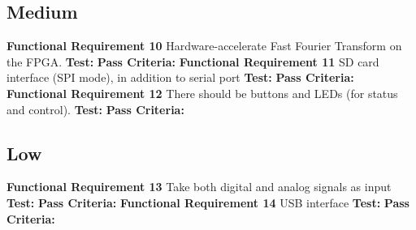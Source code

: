 \subsection{Medium}
\textbf{Functional Requirement 10}
Hardware-accelerate Fast Fourier Transform on the FPGA.
\textbf{Test:}
\textbf{Pass Criteria:}
\textbf{Functional Requirement 11}
SD card interface (SPI mode), in addition to serial port
\textbf{Test:}
\textbf{Pass Criteria:}
\textbf{Functional Requirement 12}
There should be buttons and LEDs (for status and control).
\textbf{Test:}
\textbf{Pass Criteria:}


\subsection{Low}
\textbf{Functional Requirement 13}
Take both digital and analog signals as input
\textbf{Test:}
\textbf{Pass Criteria:}
\textbf{Functional Requirement 14}
USB interface
\textbf{Test:}
\textbf{Pass Criteria:}

